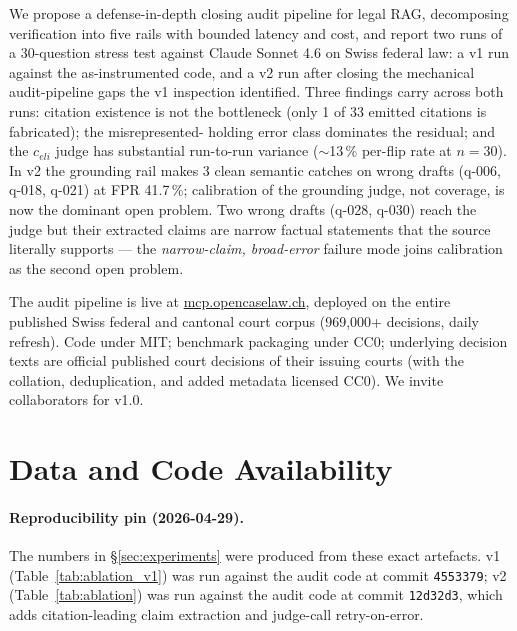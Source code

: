 \documentclass[11pt,a4paper]{article}
\begin{document}
We propose a defense-in-depth closing audit pipeline
for legal RAG, decomposing verification into five
rails with bounded latency and cost, and report two
runs of a 30-question stress test against Claude
Sonnet 4.6 on Swiss federal law: a v1 run against the
as-instrumented code, and a v2 run after closing the
mechanical audit-pipeline gaps the v1 inspection
identified.  Three findings carry across both runs:
citation existence is not the bottleneck (only 1 of
33 emitted citations is fabricated); the misrepresented-
holding error class dominates the residual; and the
$c_{eli}$ judge has substantial run-to-run variance
($\sim$13\,\% per-flip rate at $n=30$).  In v2 the
grounding rail makes 3 clean semantic catches on
wrong drafts (q-006, q-018, q-021) at FPR 41.7\,\%;
calibration of the grounding judge, not coverage,
is now the dominant open problem.  Two wrong drafts
(q-028, q-030) reach the judge but their extracted
claims are narrow factual statements that the source
literally supports --- the \emph{narrow-claim,
broad-error} failure mode joins calibration as the
second open problem.

The audit pipeline is live at
\url{mcp.opencaselaw.ch}, deployed on the entire
published Swiss federal and cantonal court corpus
(969,000+ decisions, daily refresh).  Code under
MIT; benchmark packaging under CC0; underlying
decision texts are official published court
decisions of their issuing courts (with the
collation, deduplication, and added metadata
licensed CC0).  We invite collaborators for v1.0.

\section*{Data and Code Availability}

\paragraph{Reproducibility pin (2026-04-29).}
The numbers in \S\ref{sec:experiments} were produced from
these exact artefacts.  v1 (Table~\ref{tab:ablation_v1}) was
run against the audit code at commit \texttt{4553379}; v2
(Table~\ref{tab:ablation}) was run against the audit code at
commit \texttt{12d32d3}, which adds citation-leading claim
extraction and judge-call retry-on-error.
\end{document}
